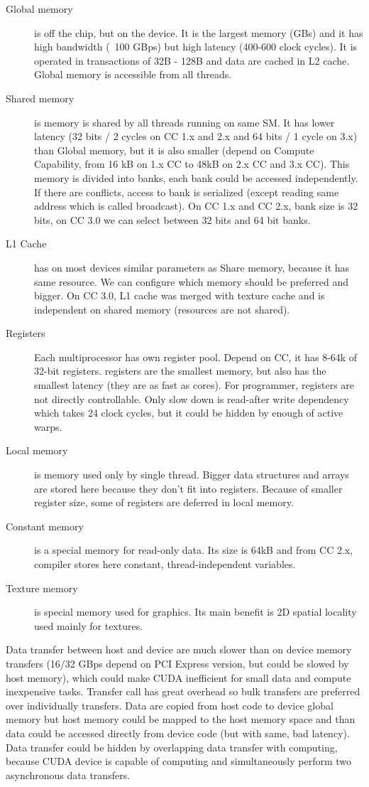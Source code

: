 \begin{description}
\item[Global memory] is off the chip, but on the device. It is the largest memory (GBs) and it has high bandwidth (~100 GBps) but high latency (400-600 clock cycles). It is operated in transactions of 32B - 128B and data are cached in L2 cache. Global memory is accessible from all threads.
\item[Shared memory] is memory is shared by all threads running on same SM. It has lower latency (32 bits / 2 cycles on CC 1.x and 2.x and 64 bits / 1 cycle on 3.x) than Global memory, but it is also smaller (depend on Compute Capability, from 16 kB on 1.x CC to 48kB on 2.x CC and 3.x CC). This memory is divided into banks, each bank could be accessed independently. If there are conflicts, access to bank is serialized (except reading same address which is called broadcast). On CC 1.x and CC 2.x, bank size is 32 bits, on CC 3.0 we can select between 32 bits and 64 bit banks.
\item[L1 Cache] has on most devices similar parameters as Share memory, because it has same resource. We can configure which memory should be preferred and bigger. On CC 3.0, L1 cache was merged with texture cache and is independent on shared memory (resources are not shared).
\item[Registers] Each multiprocessor has own register pool. Depend on CC, it has 8-64k of 32-bit registers. registers are the smallest memory, but also has the smallest latency (they are as fast as cores). For programmer, registers are not directly controllable. Only slow down is read-after write dependency which takes 24 clock cycles, but it could be hidden by enough of active warps.
\item[Local memory] is memory used only by single thread. Bigger data structures and arrays are stored here because they don't fit into registers. Because of smaller register size, some of registers are deferred in local memory.
\item[Constant memory] is a special memory for read-only data. Its size is 64kB and from CC 2.x, compiler stores here constant, thread-independent variables.
\item[Texture memory] is special memory used for graphics. Its main benefit is 2D spatial locality used mainly for textures.
\end{description}

Data transfer between host and device are much slower than on device memory transfers (16/32 GBps depend on PCI Express version, but could be slowed by host memory), which could make CUDA inefficient for small data and compute inexpensive tasks. Transfer call has great overhead so bulk transfers are preferred over individually transfers. Data are copied from host code to device global memory but host memory could be mapped to the host memory space and than data could be accessed directly from device code (but with same, bad latency). Data transfer could be hidden by overlapping data transfer with computing, because CUDA device is capable of computing and simultaneously perform two asynchronous data transfers.

